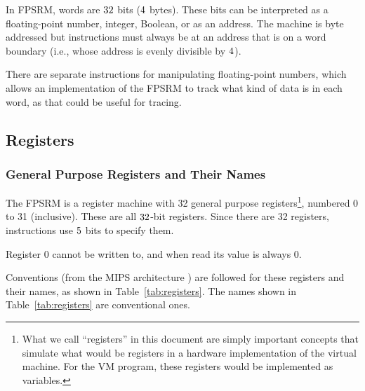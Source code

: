 \documentclass[11pt,letterpaper]{article}
\newcommand{\tabref}[1]{Table~\ref{#1}}  %
\newcommand{\tabnref}[1]{Table~\ref{#1}}  %
\begin{document}
In FPSRM, words are $32$ bits ($4$ bytes).
These bits can be interpreted as a floating-point number, integer, Boolean,
or as an address.
The machine is byte addressed but instructions must always be at an
address that is on a word boundary (i.e., whose address is evenly
divisible by $4$).

There are separate instructions for manipulating floating-point
numbers, which allows an implementation of the FPSRM to track what
kind of data is in each word, as that could be useful for tracing.

\subsection{Registers}

\subsubsection{General Purpose Registers and Their Names}

The FPSRM is a register machine with 32
general purpose registers\footnote{What we call
``registers'' in this document are simply important concepts that
simulate what would be registers in a hardware implementation of the
virtual machine. For the VM program, these registers would be implemented
as variables.},
numbered 0 to 31 (inclusive).
These are all $32$-bit registers.
Since there are 32 registers,
instructions use $5$ bits to specify them.

Register 0 cannot be written to, and when read its value is always 0.

Conventions (from the MIPS architecture \cite{Kane-Heinrich92}) are
followed for these registers and their names,
as shown in \tabref{tab:registers}.
The names shown in \tabnref{tab:registers} are conventional ones.
\end{document}
